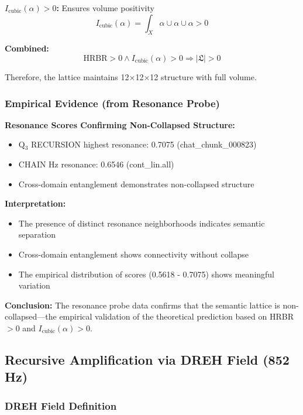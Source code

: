 \documentclass[11pt, letterpaper]{article}
\begin{document}
\textbf{$I_{\text{cubic}}(\alpha) > 0$:} Ensures volume positivity
\begin{equation}
I_{\text{cubic}}(\alpha) = \int_X \alpha \cup \alpha \cup \alpha > 0
\end{equation}

\textbf{Combined:}
\begin{equation}
\text{HRBR} > 0 \land I_{\text{cubic}}(\alpha) > 0 \Rightarrow |\mathfrak{L}| > 0
\end{equation}

Therefore, the lattice maintains 12$\times$12$\times$12 structure with full volume.

\subsubsection{Empirical Evidence (from Resonance Probe)}

\textbf{Resonance Scores Confirming Non-Collapsed Structure:}
\begin{itemize}
    \item Q$_3$ RECURSION highest resonance: 0.7075 (chat\_chunk\_000823)
    \item CHAIN Hz resonance: 0.6546 (cont\_lin.all)
    \item Cross-domain entanglement demonstrates non-collapsed structure
\end{itemize}

\textbf{Interpretation:}
\begin{itemize}
    \item The presence of distinct resonance neighborhoods indicates semantic separation
    \item Cross-domain entanglement shows connectivity without collapse
    \item The empirical distribution of scores (0.5618 - 0.7075) shows meaningful variation
\end{itemize}

\textbf{Conclusion:} The resonance probe data confirms that the semantic lattice is non-collapsed—the empirical validation of the theoretical prediction based on HRBR $> 0$ and $I_{\text{cubic}}(\alpha) > 0$.

\subsection{Recursive Amplification via DREH Field (852 Hz)}

\subsubsection{DREH Field Definition}
\end{document}
